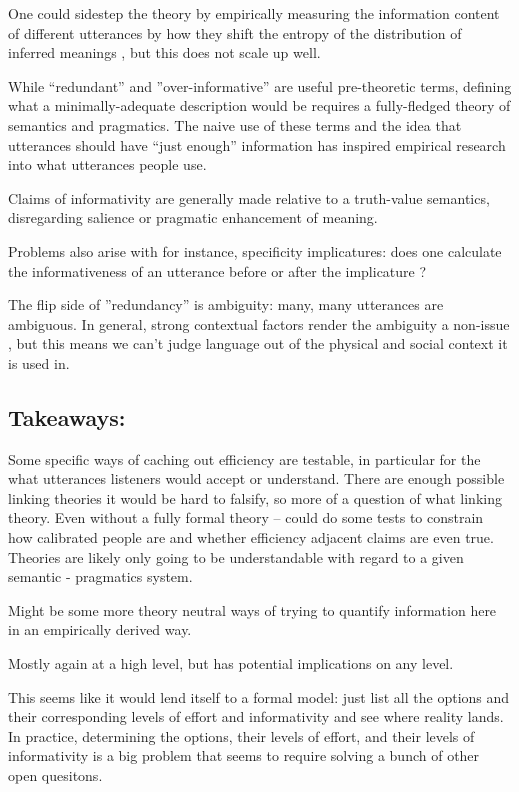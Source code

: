 \documentclass[]{article}
\begin{document}
One could sidestep the theory by empirically measuring the information content of different utterances by how they shift the entropy of the distribution of inferred meanings \cite{degen20200406}, but this does not scale up well. 


While ``redundant'' and ''over-informative'' are useful pre-theoretic terms, defining what a minimally-adequate description would be requires a fully-fledged theory of semantics and pragmatics. The naive use of these terms and the idea that utterances should have ``just enough'' information has inspired empirical research into what utterances people use. 

Claims of informativity are generally made relative to a truth-value semantics, disregarding salience or pragmatic enhancement of meaning. 

Problems also arise with for instance, specificity implicatures: does one calculate the informativeness of an utterance before or after the implicature \cite{bergen}?


The flip side of ''redundancy'' is ambiguity: many, many utterances are ambiguous. In general, strong contextual factors render the ambiguity a non-issue \cite{piantadosi2012}, but this means we can't judge language out of the physical and social context it is used in. 

\subsection{Takeaways:}
Some specific ways of caching out efficiency are testable, in particular for the what utterances listeners would accept or understand. There are enough possible linking theories it would be hard to falsify, so more of a question of what linking theory. 
Even without a fully formal theory -- could do some tests to constrain how calibrated people are and whether efficiency adjacent claims are even true. 
Theories are likely only going to be understandable with regard to a given semantic - pragmatics system. 

Might be some more theory neutral ways of trying to quantify information here in an empirically derived way. 

Mostly again at a high level, but has potential implications on any level. 

This seems like it would lend itself to a formal model: just list all the options and their corresponding levels of effort and informativity and see where reality lands. In practice, determining the options, their levels of effort, and their levels of informativity is a big problem that seems to require solving a bunch of other open quesitons. 
\end{document}
